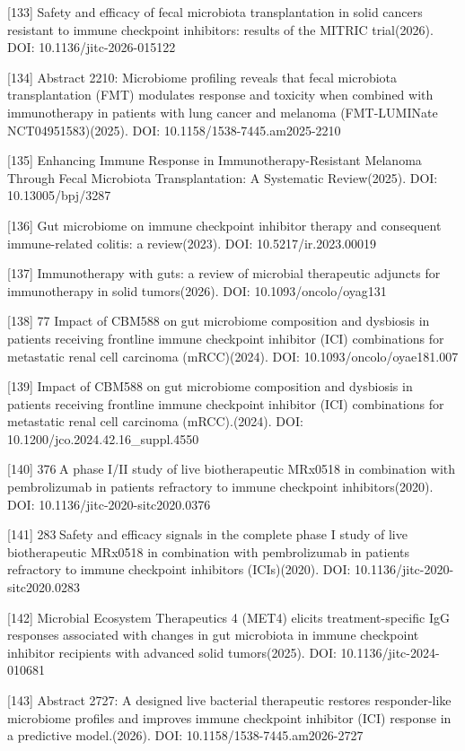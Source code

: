 \documentclass[11pt]{article}
\begin{document}
{[}133{]} Safety and efficacy of fecal microbiota transplantation in solid cancers resistant to immune checkpoint inhibitors: results of the MITRIC trial(2026). DOI: 10.1136/jitc-2026-015122

{[}134{]} Abstract 2210: Microbiome profiling reveals that fecal microbiota transplantation (FMT) modulates response and toxicity when combined with immunotherapy in patients with lung cancer and melanoma (FMT-LUMINate NCT04951583)(2025). DOI: 10.1158/1538-7445.am2025-2210

{[}135{]} Enhancing Immune Response in Immunotherapy-Resistant Melanoma Through Fecal Microbiota Transplantation: A Systematic Review(2025). DOI: 10.13005/bpj/3287

{[}136{]} Gut microbiome on immune checkpoint inhibitor therapy and consequent immune-related colitis: a review(2023). DOI: 10.5217/ir.2023.00019

{[}137{]} Immunotherapy with guts: a review of microbial therapeutic adjuncts for immunotherapy in solid tumors(2026). DOI: 10.1093/oncolo/oyag131

{[}138{]} 77 Impact of CBM588 on gut microbiome composition and dysbiosis in patients receiving frontline immune checkpoint inhibitor (ICI) combinations for metastatic renal cell carcinoma (mRCC)(2024). DOI: 10.1093/oncolo/oyae181.007

{[}139{]} Impact of CBM588 on gut microbiome composition and dysbiosis in patients receiving frontline immune checkpoint inhibitor (ICI) combinations for metastatic renal cell carcinoma (mRCC).(2024). DOI: 10.1200/jco.2024.42.16\_suppl.4550

{[}140{]} 376 A phase I/II study of live biotherapeutic MRx0518 in combination with pembrolizumab in patients refractory to immune checkpoint inhibitors(2020). DOI: 10.1136/jitc-2020-sitc2020.0376

{[}141{]} 283 Safety and efficacy signals in the complete phase I study of live biotherapeutic MRx0518 in combination with pembrolizumab in patients refractory to immune checkpoint inhibitors (ICIs)(2020). DOI: 10.1136/jitc-2020-sitc2020.0283

{[}142{]} Microbial Ecosystem Therapeutics 4 (MET4) elicits treatment-specific IgG responses associated with changes in gut microbiota in immune checkpoint inhibitor recipients with advanced solid tumors(2025). DOI: 10.1136/jitc-2024-010681

{[}143{]} Abstract 2727: A designed live bacterial therapeutic restores responder-like microbiome profiles and improves immune checkpoint inhibitor (ICI) response in a predictive model.(2026). DOI: 10.1158/1538-7445.am2026-2727
\end{document}
